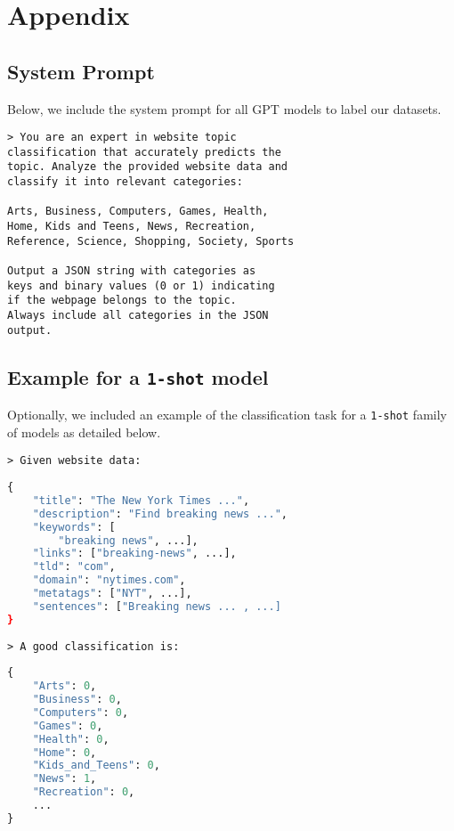 \section{Appendix}

\subsection{System Prompt}\label{app:system-prompt}
Below, we include the system prompt for all GPT models to label our datasets.

\begin{verbatim}
> You are an expert in website topic 
classification that accurately predicts the 
topic. Analyze the provided website data and 
classify it into relevant categories:

Arts, Business, Computers, Games, Health, 
Home, Kids and Teens, News, Recreation, 
Reference, Science, Shopping, Society, Sports

Output a JSON string with categories as
keys and binary values (0 or 1) indicating 
if the webpage belongs to the topic. 
Always include all categories in the JSON 
output.
\end{verbatim}

\subsection{Example for a \texttt{1-shot} model}\label{app:example-1-shot}
Optionally, we included an example of the classification task for a \texttt{1-shot} family
of models as detailed below.

\begin{verbatim}
> Given website data:
\end{verbatim}

\begin{lstlisting}[showstringspaces=false,language=Python]
{         
    "title": "The New York Times ...",
    "description": "Find breaking news ...",
    "keywords": [
        "breaking news", ...],
    "links": ["breaking-news", ...],
    "tld": "com",
    "domain": "nytimes.com",
    "metatags": ["NYT", ...],
    "sentences": ["Breaking news ... , ...]
}
\end{lstlisting}

\begin{verbatim}
> A good classification is:
\end{verbatim}

\begin{lstlisting}[showstringspaces=false,language=Python]
{
    "Arts": 0,
    "Business": 0,
    "Computers": 0,
    "Games": 0,
    "Health": 0,
    "Home": 0,
    "Kids_and_Teens": 0,
    "News": 1,
    "Recreation": 0,
    ...
}
\end{lstlisting}


